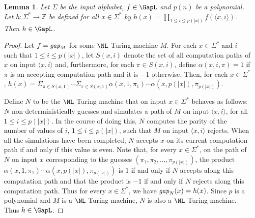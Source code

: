\documentclass{amsbook}
\newtheorem{lemma}[theorem]{Lemma}
\theoremstyle{definition}
\theoremstyle{remark}
\numberwithin{section}{chapter}
\numberwithin{equation}{chapter}
\newcommand{\Z}{\mathbb{Z}}
\newcommand{\gap}{\mbox{\it gap}}
\begin{document}
\begin{lemma}
Let $\Sigma$ be the input alphabet, $f\in\GapL$ and $p(n)$ be a polynomial. Let $h:\Sigma^*\rightarrow \Z$ be defined for all $x\in\Sigma^*$ by $h(x)=\prod _{1\leq i\leq p(|x|)}f(\langle x,i\rangle)$. Then $h\in\GapL$.
\end{lemma}
\begin{proof}
Let $f=\gap_M$ for some $\NL$ Turing machine $M$. For each $x\in\Sigma^*$ and $i$ such that $1\leq i\leq p(|x|)$, let $S(x,i)$ denote the set of all computation paths of $x$ on input $\langle x,i\rangle$ and, furthermore, for each $\pi\in S(x,i)$, define $\alpha (x,i,\pi )=1$ if $\pi$ is an accepting computation path and it is $-1$ otherwise. Then, for each $x\in\Sigma^*$, $h(x)=\Sigma_{\pi\in S(x,1)}\cdots \Sigma_{\pi\in S(x,1)}\alpha (x,1,\pi_1)\cdots \alpha (x,p(|x|),\pi_{p(|x|)})$.

Define $N$ to be the $\NL$ Turing machine that on input $x\in\Sigma^*$ behaves as follows: $N$ non-deterministically guesses and simulates a path of $M$ on input $\langle x,i\rangle$, for all $1\leq i\leq p(|x|)$. In the course of doing this, $N$ computes the parity of the number of values of $i$, $1\leq i\leq p(|x|)$, such that $M$ on input $\langle x,i\rangle$ rejects. When all the simulations have been completed, $N$ accepts $x$ on its current computation path if and only if this value is even. Note that, for every $x\in\Sigma^*$, on the path of $N$ on input $x$ corresponding to the guesses $(\pi _1,\pi _2,\ldots ,\pi _{p(|x|)})$, the product $\alpha (x,1,\pi _1)\cdots \alpha (x,p(|x|),\pi _{p(|x|)})$ is $1$ if and only if $N$ accepts along this computation path and that the product is $-1$ if and only if $N$ rejects along this computation path. Thus for every $x\in\Sigma^*$, we have $\gap_N(x)=h(x)$. Since $p$ is a polynomial and $M$ is a $\NL$ Turing machine, $N$ is also a $\NL$ Turing machine. Thus $h\in\GapL$.
\end{proof}
\end{document}
